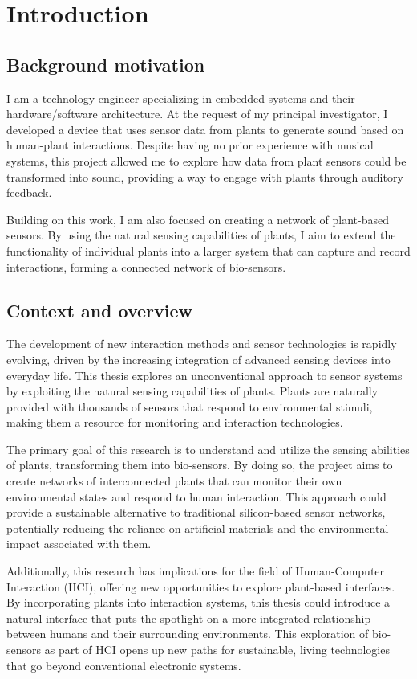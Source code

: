 \section{Introduction}

\subsection{Background motivation}

I am a technology engineer specializing in embedded systems and their hardware/software architecture. At the request of my principal investigator, I developed a device that uses sensor data from plants to generate sound based on human-plant interactions. Despite having no prior experience with musical systems, this project allowed me to explore how data from plant sensors could be transformed into sound, providing a way to engage with plants through auditory feedback.

Building on this work, I am also focused on creating a network of plant-based sensors. By using the natural sensing capabilities of plants, I aim to extend the functionality of individual plants into a larger system that can capture and record interactions, forming a connected network of bio-sensors.

\subsection{Context and overview}

The development of new interaction methods and sensor technologies is rapidly evolving, driven by the increasing integration of advanced sensing devices into everyday life. This thesis explores an unconventional approach to sensor systems by exploiting the natural sensing capabilities of plants. Plants are naturally provided with thousands of sensors that respond to environmental stimuli, making them a resource for monitoring and interaction technologies.

The primary goal of this research is to understand and utilize the sensing abilities of plants, transforming them into bio-sensors. By doing so, the project aims to create networks of interconnected plants that can monitor their own environmental states and respond to human interaction. This approach could provide a sustainable alternative to traditional silicon-based sensor networks, potentially reducing the reliance on artificial materials and the environmental impact associated with them.

Additionally, this research has implications for the field of Human-Computer Interaction (HCI), offering new opportunities to explore plant-based interfaces. By incorporating plants into interaction systems, this thesis could introduce a natural interface that puts the spotlight on a more integrated relationship between humans and their surrounding environments. This exploration of bio-sensors as part of HCI opens up new paths for sustainable, living technologies that go beyond conventional electronic systems.


